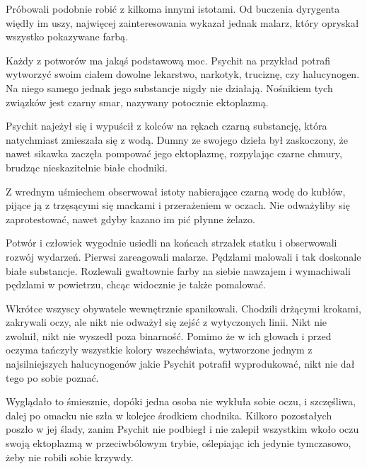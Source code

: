 {Próbowali podobnie robić z kilkoma innymi istotami.
Od buczenia dyrygenta więdły im uszy, najwięcej zainteresowania wykazał jednak malarz, który opryskał wszystko pokazywane farbą.


Każdy z potworów ma jakąś podstawową moc. Psychit na przykład potrafi wytworzyć swoim ciałem dowolne lekarstwo, narkotyk, truciznę, czy halucynogen. 
Na niego samego jednak jego substancje nigdy nie działają.
Nośnikiem tych związków jest czarny smar, nazywany potocznie ektoplazmą.

Psychit najeżył się i wypuścił z kolców na rękach czarną substancję, która natychmiast zmieszała się z wodą.
Dumny ze swojego dzieła był zaskoczony, że nawet sikawka zaczęła pompować jego ektoplazmę, rozpylając czarne chmury, brudząc nieskazitelnie białe chodniki.

Z wrednym uśmiechem obserwował istoty nabierające czarną wodę do kubłów, pijące ją z trzęsącymi się mackami i przerażeniem w oczach.
Nie odważyliby się zaprotestować, nawet gdyby kazano im pić płynne żelazo.

\divider{}

Potwór i człowiek wygodnie usiedli na końcach strzałek statku i obserwowali rozwój wydarzeń.
Pierwsi zareagowali malarze. Pędzlami malowali i tak doskonale białe substancje. 
Rozlewali gwałtownie farby na siebie nawzajem i wymachiwali pędzlami w powietrzu, chcąc widocznie je także pomalować.

Wkrótce wszyscy obywatele wewnętrznie spanikowali. Chodzili drżącymi krokami, zakrywali oczy, ale nikt nie odważył się zejść z wytyczonych linii.
Nikt nie zwolnił, nikt nie wyszedł poza binarność.
Pomimo że w ich głowach i przed oczyma tańczyły wszystkie kolory wszechświata, wytworzone jednym z najsilniejszych halucynogenów
jakie Psychit potrafił wyprodukować, nikt nie dał tego po sobie poznać.

Wyglądało to śmiesznie, dopóki jedna osoba nie wykłuła sobie oczu, i szczęśliwa, dalej po omacku nie szła w kolejce środkiem chodnika.
Kilkoro pozostałych poszło w jej ślady, zanim Psychit nie podbiegł i nie zalepił wszystkim wkoło oczu swoją ektoplazmą w przeciwbólowym trybie, oślepiając ich jedynie tymczasowo, 
żeby nie robili sobie krzywdy.

}
